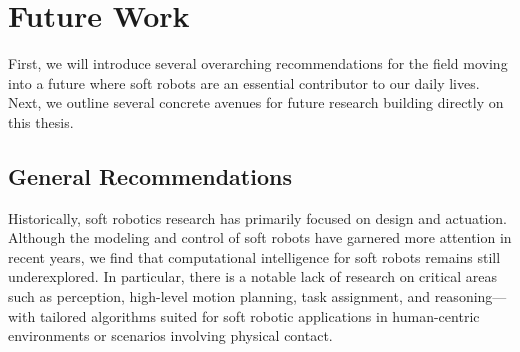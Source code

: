 \section{Future Work}\label{sec:conclusion:future_work}
First, we will introduce several overarching recommendations for the field moving into a future where soft robots are an essential contributor to our daily lives.
Next, we outline several concrete avenues for future research building directly on this thesis.

\subsection{General Recommendations}

Historically, soft robotics research has primarily focused on design and actuation. Although the modeling and control of soft robots have garnered more attention in recent years, we find that computational intelligence for soft robots remains still underexplored. In particular, there is a notable lack of research on critical areas such as perception, high-level motion planning, task assignment, and reasoning—with tailored algorithms suited for soft robotic applications in human-centric environments or scenarios involving physical contact.

